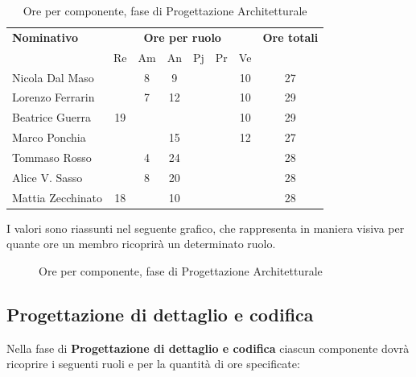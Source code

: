 \begin{table}[H]
	\centering
	\begin{tabular}{|l|c|c|c|c|c|c|c|}
		\hline
		\textbf{Nominativo} & 
		\multicolumn{6}{c|}{\textbf{Ore per ruolo}} & 
		\textbf{Ore totali} \\
		& Re & Am & An & Pj & Pr & Ve & \\
		\hline
		Nicola Dal Maso & & 8 & 9 & & & 10 & 27 \\
		Lorenzo Ferrarin & & 7 & 12 & & & 10 & 29 \\
		Beatrice Guerra & 19 & & & & & 10 & 29 \\
		Marco Ponchia & & & 15 & & & 12 & 27 \\
		Tommaso Rosso & & 4 & 24 & & & & 28 \\
		Alice V. Sasso & & 8 & 20 & & & & 28 \\
		Mattia Zecchinato & 18 & & 10 & & & & 28 \\
		\hline
	\end{tabular}
	\caption{Ore per componente, fase di Progettazione Architetturale}
\end{table}
I valori sono riassunti nel seguente grafico, che rappresenta in maniera visiva per quante ore un membro ricoprirà un determinato ruolo.
\begin{figure}[H]
	\centering
	\caption{Ore per componente, fase di Progettazione Architetturale}
\end{figure}

\subsection{Progettazione di dettaglio e codifica}
Nella fase di \textbf{Progettazione di dettaglio e codifica} ciascun componente dovrà ricoprire i seguenti ruoli e per la quantità di ore specificate:

